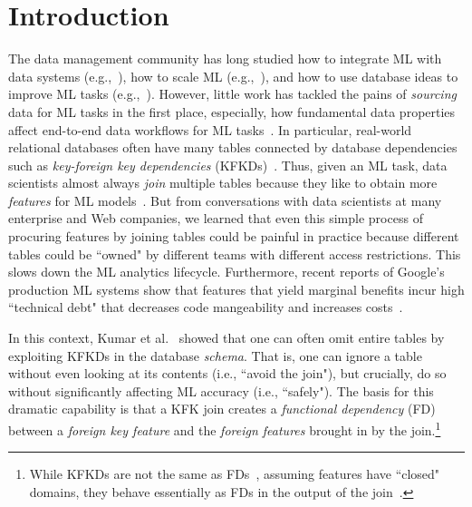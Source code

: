 \documentclass{vldb}
\begin{document}
\section{Introduction}
The data management community has long studied how to integrate ML with data systems 
(e.g.,~\cite{madlib,bismarck,riot}), how to scale ML (e.g.,~\cite{systemml,graphlab}), and 
how to use database ideas to improve ML tasks (e.g.,~\cite{columbus2,mlbase}). 
However, little work has tackled the pains of \textit{sourcing} data for ML tasks in the first place, 
especially, how fundamental data properties affect end-to-end data workflows for ML tasks~\cite{brainwash}.
%
In particular, real-world relational databases often have many tables connected by database 
dependencies such as \textit{key-foreign key dependencies} (KFKDs)~\cite{cowbook}. Thus, given 
an ML task, data scientists almost always \textit{join} multiple tables because they like to obtain 
more \textit{features} for ML models~\cite{orion}. But from conversations with data scientists 
at many enterprise and Web companies, we learned that even this simple process of procuring 
features by joining tables could be painful in practice because different tables could be 
``owned" by different teams with different access restrictions. This slows down the ML
analytics lifecycle. Furthermore, recent reports of Google's production ML systems show
that features that yield marginal benefits incur high ``technical debt" that decreases code 
mangeability and increases costs~\cite{techdebt,googletutorial}.

In this context, Kumar et al.~\cite{hamlet} showed that one can often omit entire tables by 
exploiting KFKDs in the database \textit{schema}. That is, one can ignore a table 
without even looking at its contents (i.e., ``avoid the join"), but crucially, do so without 
significantly affecting ML accuracy (i.e., ``safely"). 
The basis for this dramatic capability is that a KFK join creates a \textit{functional dependency} 
(FD) between a \textit{foreign key feature} and the \textit{foreign features} brought in by the 
join.\footnote{While KFKDs are not the same as FDs~\cite{avibook}, assuming features have
``closed" domains, they behave essentially as FDs in the output of the join~\cite{hamlet}.}
\end{document}
